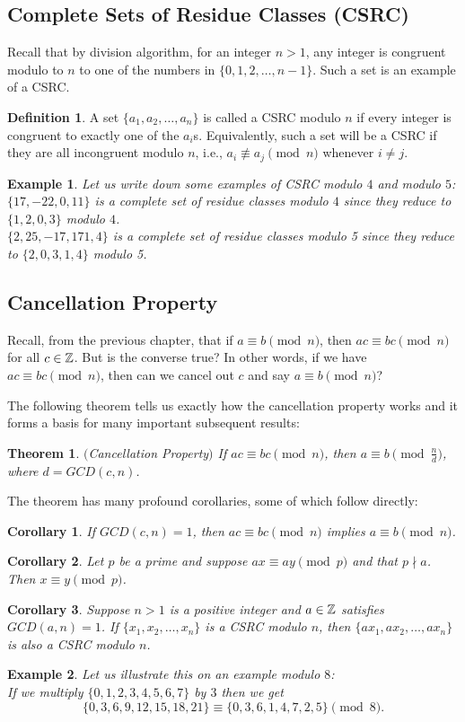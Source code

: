 \documentclass[12pt]{article}
\theoremstyle{plain}
\newtheorem{corollary}{Corollary}
\newtheorem{example}{Example}
\newtheorem{theorem}{Theorem}
\theoremstyle{definition}
\newtheorem{definition}{Definition}
\theoremstyle{remark}
\begin{document}
\subsection{Complete Sets of Residue Classes (CSRC)}
Recall that by division algorithm, for an integer $n>1$, any integer is congruent modulo to $n$ to one of the numbers in $\{0,1,2, \dots, n-1\}$. Such a set is an example of a CSRC.
\begin{definition}
A set $\{a_1, a_2, \dots, a_n\}$ is called a CSRC modulo $n$ if every integer is congruent to exactly one of the $a_i$s. Equivalently, such a set will be a CSRC if they are all incongruent modulo $n$, i.e., $a_i\not \equiv a_j \pmod{n}$ whenever $i\neq j$.
\end{definition}
\begin{example}
Let us write down some examples of CSRC modulo $4$ and modulo $5$:
\\
$\{17,-22, 0, 11\} $ is a complete set of residue classes modulo $4$ since they reduce to $\{1,2,0,3\}$ modulo $4$.
\\
$\{2, 25, -17, 171, 4\} $ is a complete set of residue classes modulo 5 since they reduce to $\{2,0,3,1,4\}$ modulo 5.
\end{example}

\subsection{Cancellation Property}
Recall, from the previous chapter, that if $a\equiv b \pmod{n}$, then $ac\equiv bc \pmod{n}$ for all $c\in \mathbb{Z}$. But is the converse true? In other words, if we have $ac\equiv bc \pmod{n}$, then can we cancel out $c$ and say $a\equiv b \pmod{n}$?

\bigskip
\noindent
The following theorem tells us exactly how the cancellation property works and it forms a basis for many important subsequent results:
\begin{theorem} $($Cancellation Property$)$
If $ac\equiv bc \pmod{n}$, then $a\equiv b \pmod{\frac{n}{d}}$, where $d=GCD(c,n)$.
\end{theorem}

\bigskip
\noindent
The theorem has many profound corollaries, some of which follow directly:
\begin{corollary}
If $GCD(c,n)=1$, then $ac\equiv bc \pmod{n}$ implies $a\equiv b \pmod{n}$.
\end{corollary}
\begin{corollary}
Let $p$ be a prime and suppose $ax\equiv ay \pmod{p}$ and that $p\nmid a$. Then $x\equiv y \pmod{p}$.
\end{corollary}
\begin{corollary}\label{CSRC}
Suppose $n>1$ is a positive integer and $a\in \mathbb{Z}$ satisfies $GCD(a,n)=1$. If $\{x_1, x_2, \dots, x_n\}$ is a CSRC modulo $n$, then $\{ax_1, ax_2, \dots, ax_n\}$ is also a CSRC modulo $n$.
\end{corollary}
\begin{example}
Let us illustrate this on an example modulo $8$:
\\
If we multiply $\{0,1,2,3,4,5,6,7\}$ by $3$ then we get
$$\{0,3,6,9,12,15,18,21\} \equiv \{0,3,6,1,4,7,2,5\} \pmod{8}.$$
\end{example}
\end{document}

